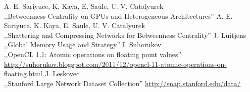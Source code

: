 
\begin{thebibliography}{9}
   A. E. Sariyuce, K. Kaya, E. Saule, U. V. Catalyurek \\
    \newblock ,,Betweenness Centrality on GPUs and Heterogeneous Architectures''
   A. E. Sariyuce, K. Kaya, E. Saule, U. V. Catalyurek \\
    \newblock ,,Shattering and Compressing Networks for Betweenness Centrality''
   J. Luitjens \\
    \newblock ,,Global Memory Usage and Strategy''
   I. Suhorukov \\
    \newblock ,,OpenCL 1.1: Atomic operations on floating point values'' \\
    \newblock \url{http://suhorukov.blogspot.com/2011/12/opencl-11-atomic-operations-on-floating.html}
   J. Leskovec \\
    \newblock ,,Stanford Large Network Dataset Collection''
    \newblock \url{http://snap.stanford.edu/data/}
\end{thebibliography}


